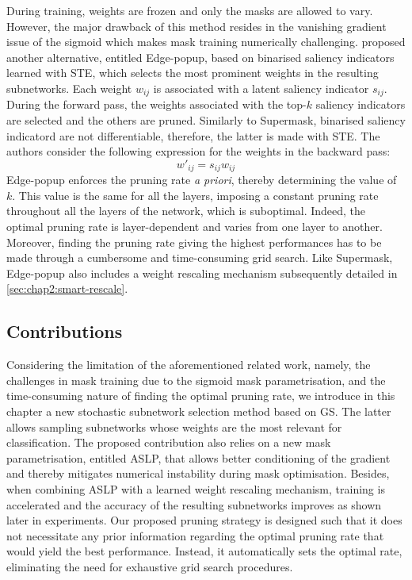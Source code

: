 During training, weights are frozen and only the masks are allowed to vary.
However, the major drawback of this method resides in the vanishing gradient
issue of the sigmoid which makes mask training numerically challenging.
\citeauthor{DBLP:conf/cvpr/RamanujanWKFR20}
\cite{DBLP:conf/cvpr/RamanujanWKFR20} proposed another alternative, entitled
Edge-popup, based on binarised saliency indicators learned with \ac{STE}, which
selects the most prominent weights in the resulting subnetworks. Each weight
$w_{ij}$ is associated with a latent saliency indicator $s_{ij}.$ During the
forward pass, the weights associated with the top-$k$ saliency indicators are
selected and the others are pruned. Similarly to Supermask, binarised saliency
indicatord are not differentiable, therefore, the latter is made with \ac{STE}.
The authors consider the following expression for the weights in the backward
pass:
\begin{equation}
  w'_{ij} = s_{ij} w_{ij}
\end{equation}
Edge-popup enforces the pruning rate \textit{a priori}, thereby determining the
value of $k$. This value is the same for all the layers, imposing a constant
pruning rate throughout all the layers of the network, which is suboptimal.
Indeed, the optimal pruning rate is layer-dependent and varies from one layer to
another. Moreover, finding the pruning rate giving the highest performances has
to be made through a cumbersome and time-consuming grid search. Like Supermask,
Edge-popup also includes a weight rescaling mechanism subsequently detailed in
\cref{sec:chap2:smart-rescale}.\\

\subsection{Contributions}
\label{sec:chap2:intro_contributions}

Considering the limitation of the aforementioned related work, namely, the
challenges in mask training due to the sigmoid mask parametrisation, and the
time-consuming nature of finding the optimal pruning rate, we introduce in this
chapter a new stochastic subnetwork selection method based on \ac{GS}. The
latter allows sampling subnetworks whose weights are the most relevant for
classification. The proposed contribution also relies on a new mask
parametrisation, entitled \acf{ASLP}, that allows better conditioning of the
gradient and thereby mitigates numerical instability during mask optimisation.
Besides, when combining \ac{ASLP} with a learned weight rescaling mechanism,
training is accelerated and the accuracy of the resulting subnetworks improves
as shown later in experiments. Our proposed pruning strategy is designed such
that it does not necessitate any prior information regarding the optimal pruning
rate that would yield the best performance. Instead, it automatically sets the
optimal rate, eliminating the need for exhaustive grid search procedures.\\ 

